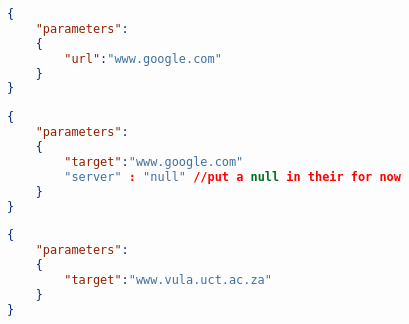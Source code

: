 \appendix
\appendixpage
\begin{lstlisting}[language=json, caption=JSON structure showing how the parameters of HTTP will look like]
{
    "parameters":
    {
        "url":"www.google.com"
    }
}
\end{lstlisting}

\begin{lstlisting}[language=json, caption=JSON structure showing how the parameters of DNS will look like]
{
    "parameters":
    {
        "target":"www.google.com"
        "server" : "null" //put a null in their for now
    }
}
\end{lstlisting}

\begin{lstlisting}[language=json, caption=JSON structure showing how the parameters of Ping will look like]
{
    "parameters":
    {
        "target":"www.vula.uct.ac.za"
    }
}
\end{lstlisting}